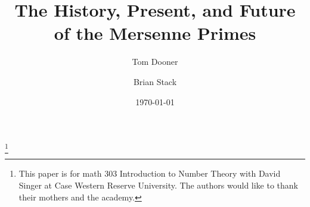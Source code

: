 \documentclass[]{amsart}
\theoremstyle{definition}
\begin{document}
\title{The History, Present, and Future of the Mersenne Primes}
\date{\today}


\thanks{This paper is for math 303 Introduction to Number Theory with David Singer at Case Western Reserve University. The authors would like to thank their mothers and the academy.}

\author{Tom Dooner}
\address{Case Western Reserve University, 
Cleveland, OH 44106}

\author{Brian Stack}
\address{Case Western Reserve University, 
Cleveland, OH 44106}

\maketitle








\end{document}
